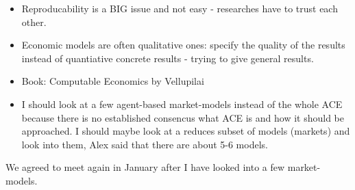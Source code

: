 \begin{itemize}
\item Reproducability is a BIG issue and not easy - researches have to trust each other.
\item Economic models are often qualitative ones: specify the quality of the results instead of quantiative concrete results - trying to give general results.
\item Book: Computable Economics by Vellupilai
\item I should look at a few agent-based market-models instead of the whole ACE because there is no established consencus what ACE is and how it should be approached. I should maybe look at a reduces subset of models (markets) and look into them, Alex said that there are about 5-6 models.
\end{itemize}

We agreed to meet again in January after I have looked into a few market-models. 